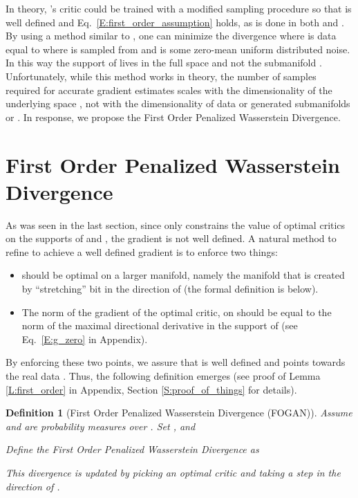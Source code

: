 \documentclass{article}
\newtheorem{definition}{Definition}
\begin{document}
 In theory, 's critic could be trained with a modified sampling procedure so that 
 is well defined and Eq.\ \ref{E:first_order_assumption} holds, as is done in both \cite{dragan} and \cite{unterthiner2017coulomb}.
 By using a method similar to \cite{bishop1998gtm}, one can minimize the divergence 
 where  is data equal to  where  is sampled from  and  is some zero-mean
 uniform distributed noise. In this way the support
 of  lives in the full space  and not the submanifold .
 Unfortunately, while this method works in theory,
 the number of samples required for accurate gradient estimates scales with the dimensionality of the underlying space ,
 not with the dimensionality of data or generated submanifolds  or .
 In response, we propose the First Order Penalized Wasserstein Divergence.
 
 \section{First Order Penalized Wasserstein Divergence}\label{S:fo_divergence}
 As was seen in the last section, since  only constrains the value of optimal critics on the supports of  and ,
 the gradient  is not well defined. A natural method to refine  to achieve
 a well defined gradient is to enforce two things:
 \begin{itemize}
  \item  should be optimal on a larger manifold, namely the manifold  that is created by
 ``stretching''  bit in the direction of  (the formal definition is below). 
  \item The norm of the gradient of the optimal critic,  on  should be equal to the norm of the maximal directional
  derivative in the support of  (see Eq.\ \ref{E:g_zero} in Appendix).
 \end{itemize}
 By enforcing these two points, we assure that  is well defined and points towards the real data . Thus, the following
 definition emerges (see proof of Lemma \ref{L:first_order} in Appendix, Section \ref{S:proof_of_things} for details).
 \begin{definition}[First Order Penalized Wasserstein Divergence (FOGAN)]\label{D:fo_divergence}
  Assume  and  are probability measures over .
  Set ,  and
  \begin{small}
  
  \end{small}
  Define the First Order Penalized Wasserstein Divergence as
  
  This divergence is updated by picking an optimal critic 
  and taking a step in the direction of .
 \end{definition}
\end{document}
